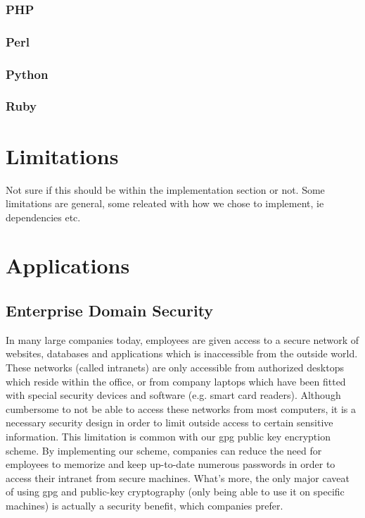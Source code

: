 \documentclass[11pt]{article}
\begin{document}
\subsubsection{PHP}
\subsubsection{Perl}
\subsubsection{Python}
\subsubsection{Ruby}

\section{Limitations} \label{sec:limitations}
Not sure if this should be within the implementation section or not. Some limitations are general, some releated with how we chose to implement, ie dependencies etc.

\section{Applications} \label{sec:applications}
\subsection{Enterprise Domain Security} \label{subsec:enterprisedomainsecurity}
In many large companies today, employees are given access to a secure network of websites, databases and applications which is inaccessible from the outside world.  These networks (called intranets) are only accessible from authorized desktops which reside within the office, or from company laptops which have been fitted with special security devices and software (e.g. smart card readers).  Although cumbersome to not be able to access these networks from most computers, it is a necessary security design in order to limit outside access to certain sensitive information.  This limitation is common with our gpg public key encryption scheme.  By implementing our scheme, companies can reduce the need for employees to memorize and keep up-to-date numerous passwords in order to access their intranet from secure machines.  What's more, the only major caveat of using gpg and public-key cryptography (only being able to use it on specific machines) is actually a security benefit, which companies prefer.
\end{document}
